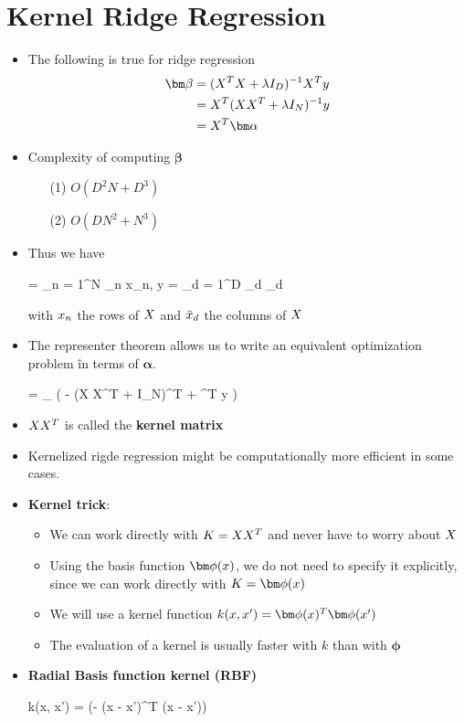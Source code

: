 \section{Kernel Ridge Regression}
\begin{itemize}
	\item The following is true for ridge regression
	\begin{align}
	    \bm \beta &= (\*X^T \*X + \lambda \*I_D)^{-1} \*X^T \*y \\
	    &= \*X^T(\*X\*X^T + \lambda \*I_N)^{-1} \*y \\
	    &= \*X^T \bm \alpha \nonumber
	\end{align}
	\item Complexity of computing $\bm \beta$
	\begin{enumerate}
		\item[(1)] $O(D^2 N + D^3)$
		\item[(2)] $O(D N^2 + N^3)$
	\end{enumerate}
	\item Thus we have
	\begin{myalign*}
	    \bm \beta = \sum_{n = 1}^N \alpha_n \*x_n, \hspace{5pt} \*y = \sum_{d = 1}^D \beta_d _d
	\end{myalign*}
	with $\*x_n$ the rows of $\*X$ and $\*{\bar{x}}_d$ the columns of $\*X$ 
	\item The representer theorem allows us to write an equivalent optimization problem în terms of $\bm \alpha$.
	\begin{myalign*}
	    \bm \alpha = \argmax_{\bm \alpha} 
	    \left(
	    - \bm \alpha (\*X \*X^T + \lambda \*I_N)^T \bm \alpha + \bm \alpha^T \*y 
	    \right)
	\end{myalign*}
	\item $\*X \*X^T$ is called the \textbf{kernel matrix}
	\item Kernelized rigde regression might be computationally more efficient in some cases.
	\item \textbf{Kernel trick}: 
	\begin{itemize}
		\item We can work directly with $\*K = \*X \*X^T $ and never have to worry about $\*X$
		\item Using the basis function $\bm \phi(\*x)$, we do not need to specify it explicitly, since we can work directly with $\*K = \bm \phi(\*x)$
		\item We will use a kernel function $k(\*x, \*x') = \bm \phi(\*x)^T \bm \phi(\*x')$
		\item The evaluation of a kernel is usually faster with $k$ than with $\bm \phi$
	\end{itemize}
	\item \textbf{Radial Basis function kernel (RBF)}
	\begin{myalign*}
	     k(\*x, \*x') = \exp(- (\*x - \*x')^T (\*x - \*x'))
	 \end{myalign*} 


\end{itemize}
